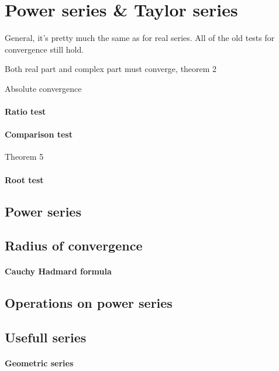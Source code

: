 \section{Power series & Taylor series}
General, it's pretty much the same as for real series. All of the old
tests for convergence still hold.

Both real part and complex part must converge, theorem 2

Absolute convergence

\paragraph{Ratio test}

\paragraph{Comparison test} Theorem 5

\paragraph{Root test}

\subsection{Power series}

\subsection{Radius of convergence}

\paragraph{Cauchy Hadmard formula}

\subsection{Operations on power series}




\subsection{Usefull series}

\paragraph{Geometric series}
